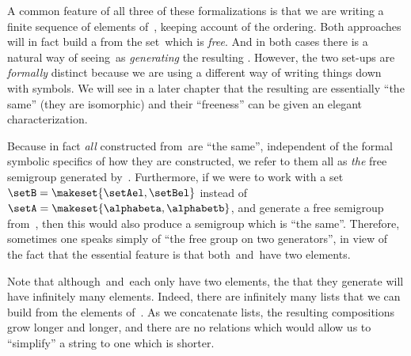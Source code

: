 A common feature of all three of these formalizations is that we are writing a finite sequence of elements of~\setA, keeping account of the ordering.
Both approaches will in fact build a   from the set~\setA which is \emph{free}.
And in both cases there is a natural way of seeing~\setA as \emph{generating} the resulting .
However, the two set-ups are \emph{formally} distinct because we are using a different way of writing things down with symbols.
We will see in a later chapter that the resulting  are essentially ``the same'' (they are isomorphic) and their ``freeness'' can be given an elegant characterization.

Because in fact \emph{all}  constructed from~\setA are ``the same'', independent of the formal symbolic specifics of how they are constructed, we refer to them all as \emph{the} free semigroup generated by~\setA.
Furthermore, if we were to work with a set~$\setB = \makeset{ \setAel, \setBel }$ instead of~$\setA = \makeset{ \alphabeta, \alphabetb}$, and generate a free semigroup from~\setB, then this would also produce a semigroup which is ``the same''.
Therefore, sometimes one speaks simply of ``the free group on two generators'', in view of the fact that the essential feature is that both~\setA and~\setB have two elements.

Note that although~\setA and~\setB each only have two elements, the  that they generate will have infinitely many elements.
Indeed, there are infinitely many lists that we can build from the elements of~\setA.
As we concatenate lists, the resulting compositions grow longer and longer, and there are no relations which would allow us to ``simplify'' a string to one which is shorter.


